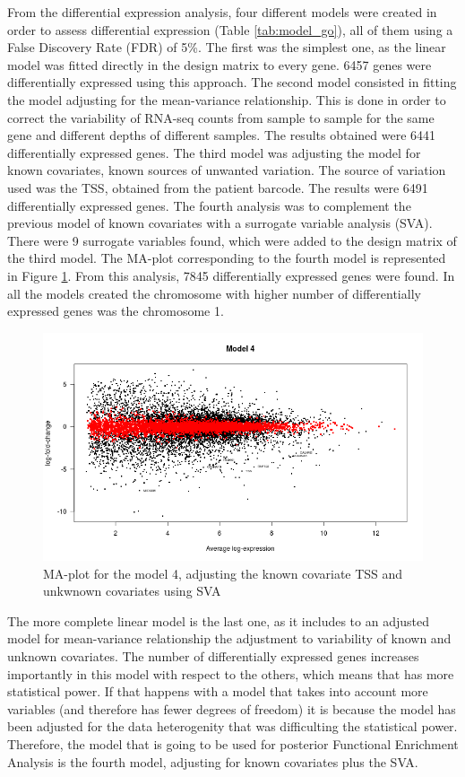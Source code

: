 \documentclass[9pt,twocolumn,twoside]{gsajnl}
\begin{document}
From the differential expression analysis, four different models were created in order to assess differential expression (Table \ref{tab:model_go}), all of them using a False Discovery Rate (FDR) of 5\%. The first was the simplest one, as the linear model was fitted directly in the design matrix to every gene. 6457 genes were differentially expressed using this approach. The second model consisted in fitting the model adjusting for the mean-variance relationship. This is done in order to correct the variability of RNA-seq counts from sample to sample for the same gene and different depths of different samples. The results obtained were 6441 differentially expressed genes. The third model was adjusting the model for known covariates, known sources of unwanted variation. The source of variation used was the TSS, obtained from the patient barcode. The results were 6491 differentially expressed genes. The fourth analysis was to complement the previous model of known covariates with a surrogate variable analysis (SVA). There were 9 surrogate variables found, which were added to the design matrix of the third model. The MA-plot corresponding to the fourth model is represented in Figure \ref{fig:MAplot}. From this analysis, 7845 differentially expressed genes were found. In all the models created the chromosome with higher number of differentially expressed genes was the chromosome 1.

\begin{figure}[htbp]
\centering
\includegraphics[width=\linewidth]{maPlot-1}
\caption{MA-plot for the model 4, adjusting the known covariate TSS and unkwnown covariates using SVA}
\label{fig:MAplot}
\end{figure}

The more complete linear model is the last one, as it includes to an adjusted model for mean-variance relationship the adjustment to variability of known and unknown covariates. The number of differentially expressed genes increases importantly in this model with respect to the others, which means that has more statistical power. If that happens with a model that takes into account more variables (and therefore has fewer degrees of freedom) it is because the model has been adjusted for the data heterogenity that was difficulting the statistical power. Therefore, the model that is going to be used for posterior Functional Enrichment Analysis is the fourth model, adjusting for known covariates plus the SVA.
\end{document}
